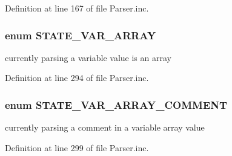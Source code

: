 \-Definition at line 167 of file \-Parser.\-inc.

\hypertarget{_parser_8inc_a6d5059571bdb3c9775a455a97d624fdd}{
\subsubsection[{\-S\-T\-A\-T\-E\-\_\-\-V\-A\-R\-\_\-\-A\-R\-R\-A\-Y}]{\setlength{\rightskip}{0pt plus 5cm}enum {\bf \-S\-T\-A\-T\-E\-\_\-\-V\-A\-R\-\_\-\-A\-R\-R\-A\-Y}}}\label{_parser_8inc_a6d5059571bdb3c9775a455a97d624fdd}
currently parsing a variable value is an array 

\-Definition at line 294 of file \-Parser.\-inc.

\hypertarget{_parser_8inc_aef5a13e3be07f3b4e06652c742b7c25a}{
\subsubsection[{\-S\-T\-A\-T\-E\-\_\-\-V\-A\-R\-\_\-\-A\-R\-R\-A\-Y\-\_\-\-C\-O\-M\-M\-E\-N\-T}]{\setlength{\rightskip}{0pt plus 5cm}enum {\bf \-S\-T\-A\-T\-E\-\_\-\-V\-A\-R\-\_\-\-A\-R\-R\-A\-Y\-\_\-\-C\-O\-M\-M\-E\-N\-T}}}\label{_parser_8inc_aef5a13e3be07f3b4e06652c742b7c25a}
currently parsing a comment in a variable array value 

\-Definition at line 299 of file \-Parser.\-inc.

